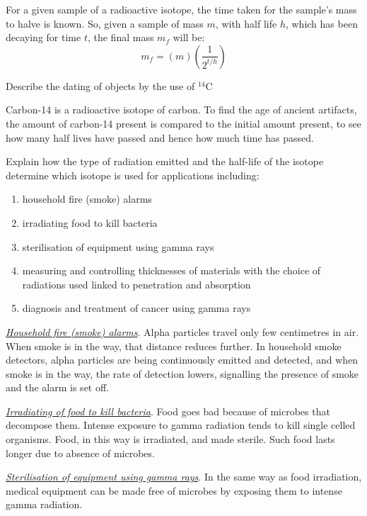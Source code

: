 For a given sample of a radioactive isotope, the time taken for the sample's mass to
halve is known. So, given a sample of mass $m$, with half life $h$, which has been
decaying for time $t$, the final mass $m_f$ will be:
$$ m_f = (m)\left(\frac{1}{2^{t/h}}\right) $$


\begin{subpoint}
Describe the dating of objects by the use of $^{14}$C
\end{subpoint}

Carbon-14 is a radioactive isotope of carbon. To find the age of ancient artifacts,
the amount of carbon-14 present is compared to the initial amount present, to see
how many half lives have passed and hence how much time has passed.

\begin{subpoint}
Explain how the type of radiation emitted and the half-life of the isotope determine
which isotope is used for applications including:
\begin{enumerate}[label=(\alph*)]
	\setlength\itemsep{0em}
	\item household fire (smoke) alarms
	\item irradiating food to kill bacteria
	\item sterilisation of equipment using gamma rays
	\item measuring and controlling thicknesses of materials with the choice of
		radiations used linked to penetration and absorption
	\item diagnosis and treatment of cancer using gamma rays
\end{enumerate}
\end{subpoint}

\emph{\ul{Household fire (smoke) alarms}}. Alpha particles travel only few centimetres
in air. When smoke is in the way, that distance reduces further. In household smoke
detectors, alpha particles are being continuously emitted and detected, and when
smoke is in the way, the rate of detection lowers, signalling the presence of smoke
and the alarm is set off.

\emph{\ul{Irradiating of food to kill bacteria}}. Food goes bad because of microbes
that decompose them. Intense exposure to gamma radiation tends to kill single celled 
organisms. Food, in this way is irradiated, and made sterile. Such food lasts longer
due to absence of microbes.

\emph{\ul{Sterilisation of equipment using gamma rays}}. In the same way as food
irradiation, medical equipment can be made free of microbes by exposing them to
intense gamma radiation.

